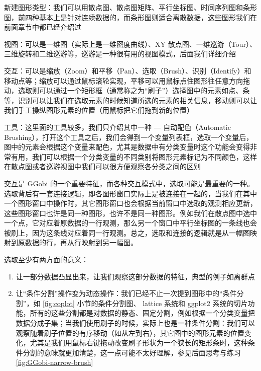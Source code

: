 \documentclass[
  b5paper,
  UTF8,twoside]{book}
\providecommand{\tightlist}{%
  \setlength{\itemsep}{0pt}\setlength{\parskip}{0pt}}
\begin{document}
\begin{description}
\tightlist
\item[Display]
新建图形类型：我们可以用散点图、散点图矩阵、平行坐标图、时间序列图和条形图，前四种基本上是针对连续数据的，而条形图则适合离散数据，这些图形我们在前面章节中都已经介绍过
\item[View]
视图：可以是一维图（实际上是一维密度曲线）、XY 散点图、一维巡游（Tour）、三维旋转和二维巡游等，巡游是一种很有用的视图模式，后面我们详细介绍
\item[Interaction]
交互：可以是缩放（Zoom）和平移（Pan）、选取（Brush）、识别（Identify）和移动点等；缩放可以通过鼠标滚轮实现，平移可以用鼠标点住图形往任意方向拖动，选取则可以通过一个矩形框（通常称之为``刷子''）选择图中的元素如点、条等，识别可以让我们在选取元素的时候知道所选的元素的相关信息，移动则可以让我们手工操纵图形元素的位置（用鼠标把它们拖到新的位置）
\item[Tools]
工具：这里面的工具较多，我们只介绍其中一种 --- 自动配色（Automatic Brushing），打开这个工具之后，我们会得到一个变量列表框，选取一个变量后，图中的元素会根据这个变量来配色，尤其是数据中有分类变量时这个功能会变得非常有用，我们可以根据一个分类变量的不同类别将图形元素标记为不同颜色，这样在散点图或者巡游视图中我们可以很方便观察各分类之间的区别
\end{description}

交互是 GGobi 的一个重要特征，而各种交互模式中，选取可能是最重要的一种。选取背后有一套连接逻辑，即各图形窗口实际上是被连接在一起的，当我们在其中一个图形窗口中操作时，其它图形窗口也会根据当前窗口中选取的观测相应更新，这些图形窗口也许是同一种图形，也许不是同一种图形。例如我们在散点图中选中一个点，它对应着原数据的一行观测，那么另一个窗口中平行坐标图的一条线也会被刷上，因为这条线对应着同一行观测。总之，选取和连接的逻辑就是从一幅图映射到原数据的行，再从行映射到另一幅图。

选取至少有两方面的意义：

\begin{enumerate}
\def\labelenumi{\arabic{enumi}.}
\item
  让一部分数据凸显出来，让我们观察这部分数据的特征，典型的例子如离群点
\item
  让``条件分割''操作变为动态操作：我们已经不止一次提到图形中的``条件分割''，如 \ref{fig:coplot} 小节的条件分割图、 lattice 系统和 ggplot2 系统的切片功能，所有的这些分割都是对数据的静态、固定分割，例如根据一个分类变量把数据分成子集；当我们使用刷子的时候，实际上也是一种条件分割：我们可以观察随着刷子位置的有序移动（如从左到右），其它图中的图形元素的位置变化，尤其是我们用鼠标右键拖动改变刷子形状为一个狭长的矩形条时，这种条件分割的意味就更加清楚，这一点可能不太好理解，参见后面思考与练习 \ref{fig:GGobi-narrow-brush}
\end{enumerate}
\end{document}
